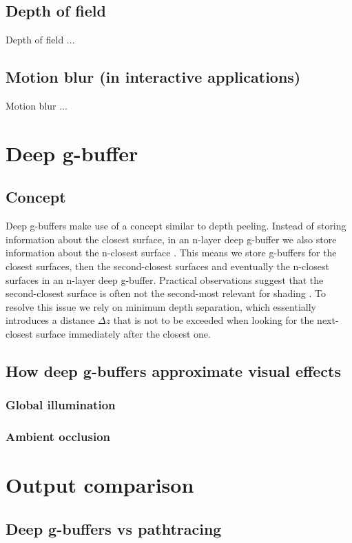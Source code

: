 \documentclass{ACGSeminar}
\begin{document}
	\subsection{Depth of field}
		Depth of field ...

	\subsection{Motion blur (in interactive applications)}
		Motion blur ...

\section{Deep g-buffer}
	\subsection{Concept}
		Deep g-buffers make use of a concept similar to depth peeling. Instead of storing information about the closest surface, in an n-layer deep g-buffer we also store information about the n-closest surface \cite{NDGB}. This means we store g-buffers for the closest surfaces, then the second-closest surfaces and eventually the n-closest surfaces in an n-layer deep g-buffer. Practical observations suggest that the second-closest surface is often not the second-most relevant for shading \cite{NDGB}. To resolve this issue we rely on minimum depth separation, which essentially introduces a distance $\Delta z$ that is not to be exceeded when looking for the next-closest surface immediately after the closest one.
	\subsection{How deep g-buffers approximate visual effects}
	\subsubsection{Global illumination}
	\subsubsection{Ambient occlusion}
	\subsubsection{}


\section{Output comparison}
	\subsection{Deep g-buffers vs pathtracing}

\printbibliography
\end{document}
